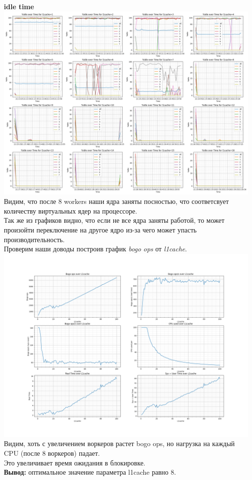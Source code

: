 \textbf{idle time}\\
\includegraphics[width=\textwidth]{./cache/image/l1cache-each-idle-cpu.png}
Видим, что после 8 workers наши ядра заняты посностью, что соответсвует количеству виртуальных ядер на процессоре.\\
Так же из графиков видно, что если не все ядра заняты работой, то может произойти переключение на другое ядро из-за чего может упасть производительность.\\
Проверим наши доводы построив график \textit{bogo ops} от \textit{l1cache}.\\
\includegraphics[width=\textwidth]{./cache/image/l1cache-bogops.png}
Видим, хоть с увеличением воркеров растет bogo ops, но нагрузка на каждый CPU (после 8 воркеров) падает. \\
Это увеличивает время ожидания в блокировке.\\
\textbf{Вывод:} оптимальное значение параметра l1cache равно 8.
